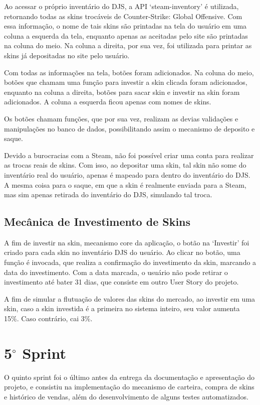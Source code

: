 Ao acessar o próprio inventário do DJS, a API ‘steam-inventory’ é utilizada, retornando todas as 
skins trocáveis de Counter-Strike: Global Offensive. Com essa informação, o nome de tais skins são 
printadas na tela do usuário em uma coluna a esquerda da tela, enquanto apenas as aceitadas pelo site 
são printadas na coluna do meio. Na coluna a direita, por sua vez, foi utilizada para printar as 
skins já depositadas no site pelo usuário. 

Com todas as informações na tela, botões foram adicionados. Na coluna do meio, botões que chamam 
uma função para investir a skin clicada foram adicionados, enquanto na coluna a direita, botões 
para sacar skin e investir na skin foram adicionados. A coluna a esquerda ficou apenas com nomes 
de skins.

Os botões chamam funções, que por sua vez, realizam as devias validações e manipulações no banco 
de dados, possibilitando assim o mecanismo de deposito e saque.

Devido a burocracias com a Steam, não foi possível criar uma conta para realizar as trocas reais 
de skins. Com isso, ao depositar uma skin, tal skin não some do inventário real do usuário, 
apenas é mapeado para dentro do inventário do DJS. A mesma coisa para o saque, em que a 
skin é realmente enviada para a Steam, mas sim apenas retirada do inventário do DJS, 
simulando tal troca.

\subsection{Mecânica de Investimento de Skins}
A fim de investir na skin, mecanismo core da aplicação, o botão na ‘Investir’ foi criado 
para cada skin no inventário DJS do usuário. Ao clicar no botão, uma função é invocada, 
que realiza a confirmação do investimento da skin, marcando a data do investimento.
Com a data marcada, o usuário não pode retirar o investimento até bater 31 dias, que 
consiste em outro User Story do projeto.

A fim de simular a flutuação de valores das skins do mercado, ao investir em uma skin, 
caso a skin investida é a primeira no sistema inteiro, seu valor aumenta 
15\%. Caso contrário, cai 3\%.

\section{5$^{\circ}$ Sprint}
O quinto sprint foi o último antes da entrega da documentação e apresentação do projeto, e consistiu na implementação do mecanismo de carteira, compra de skins e histórico de vendas, além do desenvolvimento de alguns testes automatizados.

